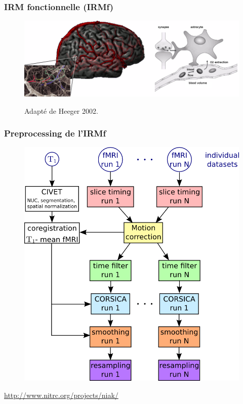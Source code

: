\documentclass{beamer}
\begin{document}
\begin{frame}
\frametitle{IRM fonctionnelle (IRMf)}
\begin{figure}[H]
\begin{center}
\includegraphics[width=\linewidth]{../figures/bold.png}
\end{center}
\tiny{Adapté de Heeger 2002.}
\end{figure}
\end{frame}

\begin{frame}
\frametitle{Preprocessing de l'IRMf}
\begin{figure}[H]
\begin{center}
\includegraphics[scale=0.6]{../figures/fig_flowchart_fmri_preprocess.png}
\end{center}
\end{figure}
\tiny{\url{http://www.nitrc.org/projects/niak/}}
\end{frame}
\end{document}
